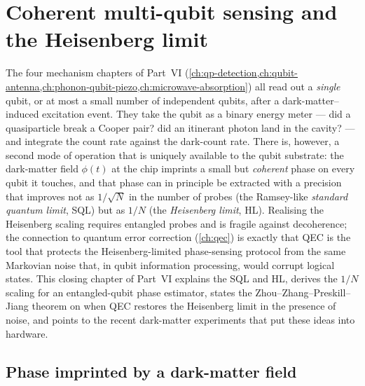 \chapter{Coherent multi-qubit sensing and the Heisenberg limit}
\label{ch:coherent-multiqubit}

The four mechanism chapters of Part~VI
(\cref{ch:qp-detection,ch:qubit-antenna,ch:phonon-qubit-piezo,ch:microwave-absorption})
all read out a \emph{single} qubit, or at most a small number of
independent qubits, after a dark-matter--induced excitation
event. They take the qubit as a binary energy meter --- did a
quasiparticle break a Cooper pair? did an itinerant photon land
in the cavity? --- and integrate the count rate against the
dark-count rate. There is, however, a second mode of operation
that is uniquely available to the qubit substrate: the
dark-matter field $\phi(t)$ at the chip imprints a small but
\emph{coherent} phase on every qubit it touches, and that phase
can in principle be extracted with a precision that improves not
as $1/\sqrt{N}$ in the number of probes (the Ramsey-like
\emph{standard quantum limit}, SQL) but as $1/N$ (the
\emph{Heisenberg limit}, HL). Realising the Heisenberg
scaling requires entangled probes and is fragile against
decoherence; the connection to quantum error correction
(\cref{ch:qec}) is exactly that QEC
is the tool that protects the Heisenberg-limited phase-sensing
protocol from the same Markovian noise that, in qubit
information processing, would corrupt logical states. This
closing chapter of Part~VI explains the SQL and HL, derives the
$1/N$ scaling for an entangled-qubit phase estimator, states the
Zhou--Zhang--Preskill--Jiang theorem on when QEC restores
the Heisenberg limit in the presence of noise, and points to
the recent dark-matter experiments that put these ideas into
hardware.

\section{Phase imprinted by a dark-matter field}
\label{sec:dm-phase}

